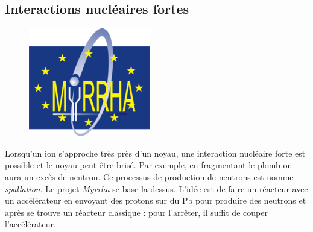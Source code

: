 \subsection*{Interactions nucléaires fortes}
	\begin{figure}
	\vspace{-7mm}
	\includegraphics[scale=1.5]{ch2/image10.png}
	\end{figure}
Lorsqu'un ion s'approche très près d'un noyau, une interaction nucléaire forte est possible et le
noyau peut être brisé. Par exemple, en fragmentant le plomb on aura un excès de neutron. Ce 
processus de production de neutrons est nomme \textit{spallation}. Le projet \textit{Myrrha} se
base la dessus. L'idée est de faire un réacteur avec un accélérateur en envoyant des protons sur
du Pb pour produire des neutrons et après se trouve un réacteur classique : pour l'arrêter, il suffit
de couper l'accélérateur.